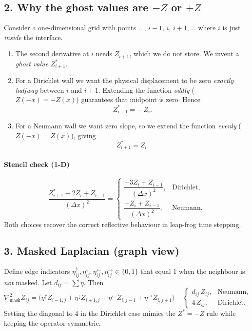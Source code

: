 \documentclass{article}
\begin{document}
\subsection*{2. Why the ghost values are $-Z$ or $+Z$}

Consider a one-dimensional grid with points \(\dots,\,i-1,\,i,\,i+1,\dots\)
where \(i\) is just \emph{inside} the interface.

\begin{enumerate}
\item The second derivative at \(i\) needs \(Z_{i+1}\), which we do not
      store.  We invent a \emph{ghost value} \(Z^\ast_{i+1}\).
\item For a Dirichlet wall we want the physical displacement to be zero
      \emph{exactly halfway} between \(i\) and \(i+1\).  Extending the
      function \emph{oddly} (\(Z(-x)=-Z(x)\)) guarantees that midpoint
      is zero.  Hence
      \[
        Z^\ast_{i+1} = -\,Z_i.
      \]
\item For a Neumann wall we want zero slope, so we extend the function
      \emph{evenly} (\(Z(-x)=Z(x)\)), giving
      \[
        Z^\ast_{i+1} = Z_i.
      \]
\end{enumerate}

\paragraph{Stencil check (1-D)}

\[
\frac{Z^\ast_{i+1}-2Z_i+Z_{i-1}}{(\Delta x)^2}=
\begin{cases}
\dfrac{-3Z_i+Z_{i-1}}{(\Delta x)^2}, & \text{Dirichlet},\\[6pt]
\dfrac{-Z_i+Z_{i-1}}{(\Delta x)^2},  & \text{Neumann}.
\end{cases}
\]
Both choices recover the correct reflective behaviour in leap-frog
time stepping.

\subsection*{3. Masked Laplacian (graph view)}

Define edge indicators
\(\eta^{\uparrow}_{ij},\eta^{\downarrow}_{ij},
 \eta^{\leftarrow}_{ij},\eta^{\rightarrow}_{ij}\in\{0,1\}\)
that equal 1 when the neighbour is \emph{not} masked.
Let \(d_{ij}=\sum\eta\).  Then
\[
\nabla^2_{\text{mask}}Z_{ij}=
\bigl(
  \eta^{\uparrow}Z_{i-1,j}+\eta^{\downarrow}Z_{i+1,j}
 +\eta^{\leftarrow}Z_{i,j-1}+\eta^{\rightarrow}Z_{i,j+1}
\bigr)
-
\begin{cases}
d_{ij}\,Z_{ij}, & \text{Neumann},\\[6pt]
4\,Z_{ij}, & \text{Dirichlet}.
\end{cases}
\]
Setting the diagonal to 4 in the Dirichlet case mimics the
\(Z^\ast=-Z\) rule while keeping the operator symmetric.
\end{document}
